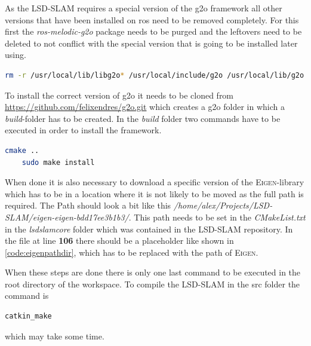 As the LSD-SLAM requires a special version of the \gls{g2o} framework all other versions that have been installed on \gls{ros} need to be removed completely. For this first the \textit{ros-melodic-g2o} package needs to be purged and the leftovers need to be deleted to not conflict with the special version that is going to be installed later using.\newline
\begin{lstlisting}[language=bash]
    rm -r /usr/local/lib/libg2o* /usr/local/include/g2o /usr/local/lib/g2o /usr/local/bin/g2o*
\end{lstlisting}

To install the correct version of \gls{g2o} it needs to be cloned from \url{https://github.com/felixendres/g2o.git} which creates a g2o folder in which a \textit{build}-folder has to be created. In the \textit{build} folder two commands have to be executed in order to install the framework.\newline
\begin{lstlisting}[language=bash]
    cmake ..
    sudo make install
\end{lstlisting}

When done it is also necessary to download a specific version of the \textsc{Eigen}-library which has to be in a location where it is not likely to be moved as the full path is required. The Path should look a bit like this \textit{/home/alex/Projects/LSD-SLAM/eigen-eigen-bdd17ee3b1b3/}. This path needs to be set in the \textit{CMakeList.txt} in the \textit{lsd\textunderscore slam\textunderscore core} folder which was contained in the LSD-SLAM repository. In the file at line \textbf{106} there should be a placeholder like shown in \ref{code:eigenpathdir}, which has to be replaced with the path of \textsc{Eigen}.\newline


When these steps are done there is only one last command to be executed in the root directory of the workspace. To compile the LSD-SLAM in the src folder the command is \newline
\begin{lstlisting}[language=bash]
    catkin_make
\end{lstlisting}
which may take some time. 